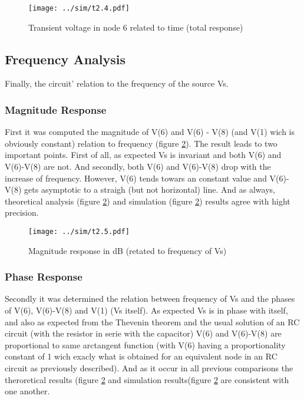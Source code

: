 \begin{figure}[h] \centering
\texttt{[image: ../sim/t2.4.pdf]}
\caption{Transient voltage in node 6 related to time (total response)}
\label{fig:trans2}
\end{figure}





\subsection{Frequency Analysis}

Finally, the circuit' relation to the frequency of the source Vs.

\subsubsection{Magnitude Response}

First it was computed the magnitude of V(6) and V(6) - V(8) (and V(1) wich is obviously constant) relation to frequency (figure \ref{fig:acm}). The result leads to two important points. First of all, as expected Vs is invariant and both V(6) and V(6)-V(8) are not. And secondly, both V(6) and V(6)-V(8) drop with the increase of frequency. However, V(6) tends towars an constant value and V(6)-V(8) gets asymptotic to a straigh (but not horizontal) line. And as always, theoretical analysis (figure \ref{fig:acm}) and simulation (figure \ref{fig:acm}) results agree with hight precision.

\begin{figure}[h] \centering
\texttt{[image: ../sim/t2.5.pdf]}
\caption{Magnitude response in dB (retated to frequency of Vs)}
\label{fig:acm}
\end{figure}


\subsubsection{Phase Response}

Secondly it was determined the relation between frequency of Vs and the phases of V(6), V(6)-V(8) and V(1) (Vs itself). As expected Vs is in phase with itself, and also as expected from the Thevenin theorem  and the usual solution of an RC circuit (with the resistor in serie with the capacitor) V(6) and V(6)-V(8) are proportional to same arctangent function (with V(6) having a proportionality constant of 1 wich exacly what is obtained for an equivalent node in an RC circuit as previously described). And as it occur in all previous comparisons the theroretical results (figure \ref{fig:acm} and simulation results(figure \ref{fig:acm} are consistent with one another.

